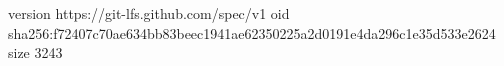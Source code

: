 version https://git-lfs.github.com/spec/v1
oid sha256:f72407c70ae634bb83beec1941ae62350225a2d0191e4da296c1e35d533e2624
size 3243
